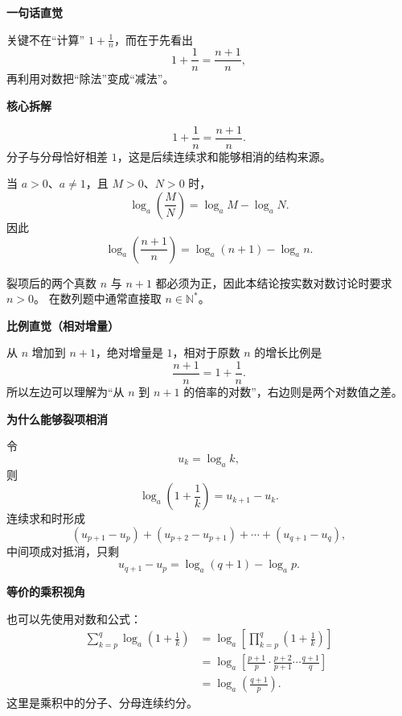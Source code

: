 \begin{explanationbox}
	\textbf{\textcolor{CExplanation}{一句话直觉}}

	关键不在“计算” \(1+\frac{1}{n}\)，而在于先看出
	\[
		1+\frac{1}{n}=\frac{n+1}{n},
	\]
	再利用对数把“除法”变成“减法”。

	\medskip
	\textbf{\textcolor{CExplanation}{核心拆解}}
	\begin{description}[style=nextline, leftmargin=2.8em, labelsep=0.5em, itemsep=0.45em]
		\item[\textbf{要点一（先识别相邻整数之比）：}]
		      \[
			      1+\frac{1}{n}
			      =\frac{n+1}{n}.
		      \]
		      分子与分母恰好相差 \(1\)，这是后续连续求和能够相消的结构来源。

		\item[\textbf{要点二（再使用对数商法则）：}]
		      当 \(a>0\)、\(a\neq1\)，且 \(M>0\)、\(N>0\) 时，
		      \[
			      \log_a\!\left(\frac{M}{N}\right)
			      =\log_a M-\log_a N.
		      \]
		      因此
		      \[
			      \log_a\!\left(\frac{n+1}{n}\right)
			      =\log_a(n+1)-\log_a n.
		      \]

		\item[\textbf{要点三（定义域必须检查）：}]
		      裂项后的两个真数 \(n\) 与 \(n+1\) 都必须为正，因此本结论按实数对数讨论时要求 \(n>0\)。
		      在数列题中通常直接取 \(n\in\mathbb N^*\)。
	\end{description}

	\medskip
	\textbf{\textcolor{CExplanation}{比例直觉（相对增量）}}

	从 \(n\) 增加到 \(n+1\)，绝对增量是 \(1\)，相对于原数 \(n\) 的增长比例是
	\[
		\frac{n+1}{n}=1+\frac{1}{n}.
	\]
	所以左边可以理解为“从 \(n\) 到 \(n+1\) 的倍率的对数”，右边则是两个对数值之差。

	\medskip
	\textbf{\textcolor{CExplanation}{为什么能够裂项相消}}

	令
	\[
		u_k=\log_a k,
	\]
	则
	\[
		\log_a\!\left(1+\frac{1}{k}\right)
		=u_{k+1}-u_k.
	\]
	连续求和时形成
	\[
		(u_{p+1}-u_p)+(u_{p+2}-u_{p+1})+\cdots+(u_{q+1}-u_q),
	\]
	中间项成对抵消，只剩
	\[
		u_{q+1}-u_p
		=\log_a(q+1)-\log_a p.
	\]

	\medskip
	\textbf{\textcolor{CExplanation}{等价的乘积视角}}

	也可以先使用对数和公式：
	\[
		\begin{aligned}
			\sum_{k=p}^{q}\log_a\!\left(1+\frac{1}{k}\right)
			 & =\log_a\!\left[
				\prod_{k=p}^{q}\left(1+\frac{1}{k}\right)
			\right]                                 \\
			 & =\log_a\!\left[
				\frac{p+1}{p}\cdot\frac{p+2}{p+1}\cdots\frac{q+1}{q}
			\right]                                 \\
			 & =\log_a\!\left(\frac{q+1}{p}\right).
		\end{aligned}
	\]
	这里是乘积中的分子、分母连续约分。


\end{explanationbox}
